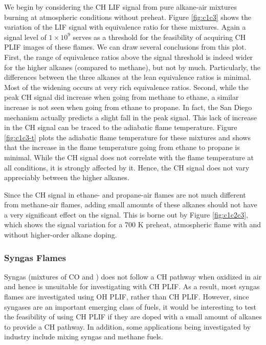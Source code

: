 We begin by considering the CH LIF signal from pure alkane-air mixtures burning at atmospheric conditions without preheat.
Figure \ref{fig:c1c3} shows the variation of the LIF signal with equivalence ratio for these mixtures.
Again a signal level of \(1\times10^9\) serves as a threshold for the feasibility of acquiring CH PLIF images of these flames.
We can draw several conclusions from this plot.
First, the range of equivalence ratios above the signal threshold is indeed wider for the higher alkanes (compared to methane), but not by much.
Particularly, the differences between the three alkanes at the lean equivalence ratios is minimal.
Most of the widening occurs at very rich equivalence ratios.
Second, while the peak CH signal did increase when going from methane to ethane, a similar increase is not seen when going from ethane to propane.
In fact, the San Diego mechanism actually predicts a slight fall in the peak signal.
This lack of increase in the CH signal can be traced to the adiabatic flame temperature.
Figure \ref{fig:c1c3-t} plots the adiabatic flame temperature for these mixtures and shows that the increase in the flame temperature going from ethane to propane is minimal.
While the CH signal does not correlate with the flame temperature at all conditions, it is strongly affected by it.
Hence, the CH signal does not vary appreciably between the higher alkanes.




Since the CH signal in ethane- and propane-air flames are not much different from methane-air flames, adding small amounts of these alkanes should not have a very significant effect on the signal.
This is borne out by Figure \ref{fig:c1c2c3}, which shows the signal variation for a 700 K preheat, atmospheric flame with and without higher-order alkane doping.



\subsubsection{Syngas Flames}

Syngas (mixtures of CO and ) does not follow a CH pathway when oxidized in air and hence is unsuitable for investigating with CH PLIF.
As a result, most syngas flames are investigated using OH PLIF, rather than CH PLIF.
However, since syngases are an important emerging class of fuels, it would be interesting to test the feasibility of using CH PLIF if they are doped with a small amount of alkanes to provide a CH pathway.
In addition, some applications being investigated by industry include mixing syngas and methane fuels.

